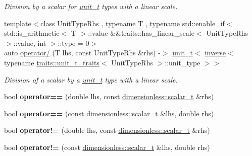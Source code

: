 \begin{DoxyCompactItemize}
\begin{DoxyCompactList}\small\item\em Division by a scalar for \hyperlink{classunits_1_1unit__t}{unit\+\_\+t} types with a linear scale. \end{DoxyCompactList}\item 
\hypertarget{namespaceunits_a88bc970d8a608586597c43a6b947c644}{}{\footnotesize template$<$class Unit\+Type\+Rhs , typename T , typename std\+::enable\+\_\+if$<$ std\+::is\+\_\+arithmetic$<$ T $>$\+::value \&\&traits\+::has\+\_\+linear\+\_\+scale$<$ Unit\+Type\+Rhs $>$\+::value, int $>$\+::type  = 0$>$ }\\auto \hyperlink{namespaceunits_a88bc970d8a608586597c43a6b947c644}{operator/} (T lhs, const Unit\+Type\+Rhs \&rhs) -\/$>$ \hyperlink{classunits_1_1unit__t}{unit\+\_\+t}$<$ \hyperlink{group___unit_manipulators_gaacc539ef162e24b260d023d3ff949b57}{inverse}$<$ typename \hyperlink{structunits_1_1traits_1_1unit__t__traits}{traits\+::unit\+\_\+t\+\_\+traits}$<$ Unit\+Type\+Rhs $>$\+::unit\+\_\+type $>$$>$\label{namespaceunits_a88bc970d8a608586597c43a6b947c644}

\begin{DoxyCompactList}\small\item\em Division of a scalar by a \hyperlink{classunits_1_1unit__t}{unit\+\_\+t} type with a linear scale. \end{DoxyCompactList}\item 
\hypertarget{namespaceunits_a150c1d13f1414ebbd4eb9c75c29d2f37}{}bool {\bfseries operator==} (double lhs, const \hyperlink{classunits_1_1unit__t}{dimensionless\+::scalar\+\_\+t} \&rhs)\label{namespaceunits_a150c1d13f1414ebbd4eb9c75c29d2f37}

\item 
\hypertarget{namespaceunits_ad0fb7d4574e1a2f82d573958d8e4cbe3}{}bool {\bfseries operator==} (const \hyperlink{classunits_1_1unit__t}{dimensionless\+::scalar\+\_\+t} \&lhs, double rhs)\label{namespaceunits_ad0fb7d4574e1a2f82d573958d8e4cbe3}

\item 
\hypertarget{namespaceunits_ab2af67bb118928918c5b97bab43f8eb8}{}bool {\bfseries operator!=} (double lhs, const \hyperlink{classunits_1_1unit__t}{dimensionless\+::scalar\+\_\+t} \&rhs)\label{namespaceunits_ab2af67bb118928918c5b97bab43f8eb8}

\item 
\hypertarget{namespaceunits_ac72cf6e1978a9be631c95d84df128f65}{}bool {\bfseries operator!=} (const \hyperlink{classunits_1_1unit__t}{dimensionless\+::scalar\+\_\+t} \&lhs, double rhs)\label{namespaceunits_ac72cf6e1978a9be631c95d84df128f65}


\end{DoxyCompactItemize}
